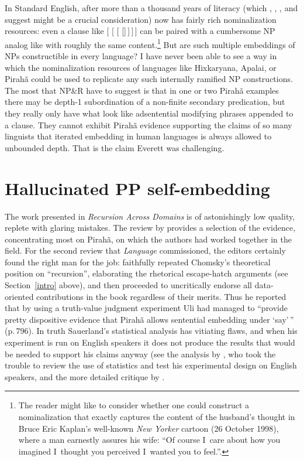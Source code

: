 \documentclass[output=paper,colorlinks,citecolor=brown
]{langscibook}
\begin{document}
In Standard English, after more than a thousand years of literacy
(which \citealt{ONeil77}, \citealt{Givon79}, \citealt{Mithun84}, and
\citealt{Kalmar85} suggest might be a crucial consideration) now has
fairly rich nominalization resources: even a clause like
 [ [
[ []\,]\,]\,] can be paired with
a cumbersome NP analog like  with roughly
the same content.\footnote{\label{cartoon}%
   The reader might like to consider whether one could construct a
   nominalization that exactly captures the content of the husband's
   thought in Bruce Eric Kaplan's well-known \textit{New Yorker}
   cartoon (26 October 1998), where a man earnestly assures his wife:
   ``Of course I~care about how you imagined I~thought you perceived
   I~wanted you to feel.''.}
But are such multiple embeddings of NPs constructible in every language?
I have never been able to see a way in which the nominalization resources
of languages like Hixkaryana, Apalai, or Pirah{\~a} could be used to
replicate any such internally ramified NP constructions. The most that
NP\&R have to suggest is that in one or two Pirah{\~a} examples there
may be depth-1 subordination of a non-finite secondary predication, but
they really only have what look like adsentential modifying phrases
appended to a clause. They cannot exhibit Pirah{\~a} evidence supporting
the claims of so many linguists that iterated embedding in human
languages is always allowed to unbounded depth. That is the claim
Everett was challenging.

\section{Hallucinated PP self-embedding}\label{ppsection}\largerpage

The work presented in \textit{Recursion Across Domains} \citep{AmMaNeRo18}
is of astonishingly low quality, replete with glaring mistakes. The review
by \citet{EverGibs19} provides a selection of the evidence, concentrating
most on Pirah{\~a}, on which the authors had worked together in the field.
For the second review that \textit{Language} commissioned, the editors
certainly found the right man for the job: \citet{Hornstein19} faithfully
repeated Chomsky's theoretical position on ``recursion'', elaborating
the rhetorical escape-hatch arguments (see Section~\ref{intro} above),
and then proceeded to uncritically endorse all data-oriented contributions
in the book regardless of their merits. Thus he reported that by using a
truth-value judgment experiment Uli \citet{Sauerland18} had managed to
``provide pretty dispositive evidence that Pirah{\~a} allows sentential
embedding under `say'\,'' (p.\,796). In truth Sauerland's statistical
analysis has vitiating flaws, and when his experiment is run on English
speakers it does not produce the results that would be needed to
support his claims anyway (see the analysis by
\citealt[781--784]{EverGibs19}, who took the trouble to review the use
of statistics and test his experimental design on English speakers,
and the more detailed critique by .
\end{document}
